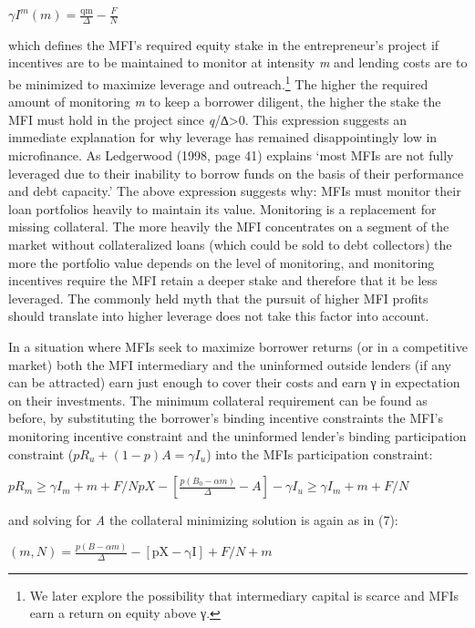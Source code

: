 \documentclass[
]{article}
\begin{document}
\(\gamma I^{m}(m) = \frac{\text{qm}}{\Delta} - \frac{F}{N}\)

which defines the MFI's required equity stake in the entrepreneur's
project if incentives are to be maintained to monitor at intensity
\emph{m} and lending costs are to be minimized to maximize leverage and
outreach.\footnote{We later explore the possibility that intermediary
  capital is scarce and MFIs earn a return on equity above γ.} The
higher the required amount of monitoring \emph{m} to keep a borrower
diligent, the higher the stake the MFI must hold in the project since
\emph{q}/∆\textgreater{}0. This expression suggests an immediate
explanation for why leverage has remained disappointingly low in
microfinance. As Ledgerwood (1998, page 41) explains `most MFIs are not
fully leveraged due to their inability to borrow funds on the basis of
their performance and debt capacity.' The above expression suggests why:
MFIs must monitor their loan portfolios heavily to maintain its value.
Monitoring is a replacement for missing collateral. The more heavily the
MFI concentrates on a segment of the market without collateralized loans
(which could be sold to debt collectors) the more the portfolio value
depends on the level of monitoring, and monitoring incentives require
the MFI retain a deeper stake and therefore that it be less leveraged.
The commonly held myth that the pursuit of higher MFI profits should
translate into higher leverage does not take this factor into account.

In a situation where MFIs seek to maximize borrower returns (or in a
competitive market) both the MFI intermediary and the uninformed outside
lenders (if any can be attracted) earn just enough to cover their costs
and earn γ in expectation on their investments. The minimum collateral
requirement can be found as before, by substituting the borrower's
binding incentive constraints the MFI's monitoring incentive constraint
and the uninformed lender's binding participation constraint
(\(pR_{u} + (1 - p)A = \gamma I_{u}\)) into the MFIs participation
constraint:

\(pR_{m} \geq \gamma I_{m} + m + F/N
pX - \left\lbrack \frac{p(B_{0} - \alpha m)}{\Delta} - A \right\rbrack - \gamma I_{u} \geq \gamma I_{m} + m + F/N\)

and solving for \emph{A} the collateral minimizing solution is again as
in (7):

\((m,N) = \frac{p(B - \alpha m)}{\Delta} - \left\lbrack \text{pX} - \text{γI} \right\rbrack + F/N + m\)
\end{document}
